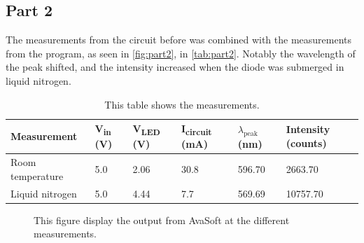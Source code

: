 \subsection{Part 2}
The measurements from the circuit before was combined with the measurements from the program, as seen in \autoref{fig:part2}, in \autoref{tab:part2}. Notably the wavelength of the peak shifted, and the intensity increased when the diode was submerged in liquid nitrogen.

\begin{table}[H]
    \centering
    \caption{This table shows the measurements.}
    \begin{tabular}{@{}llllll@{}}
    \toprule
    Measurement      & V\textsubscript{in} (V) & V\textsubscript{LED} (V) & I\textsubscript{circuit} (mA) & $\lambda_\text{peak}$ (nm) & Intensity (counts) \\ \midrule
    Room temperature & 5.0& 2.06& 30.8& 596.70& 2663.70\\
    Liquid nitrogen  & 5.0& 4.44                     & 7.7& 569.69& 10757.70\\ \bottomrule
    \end{tabular}
    \label{tab:part2}
    \end{table}


\begin{figure}[H]
    \centering
    \hfill
    \caption{This figure display the output from AvaSoft at the different measurements.}
    \label{fig:part2}
\end{figure}





